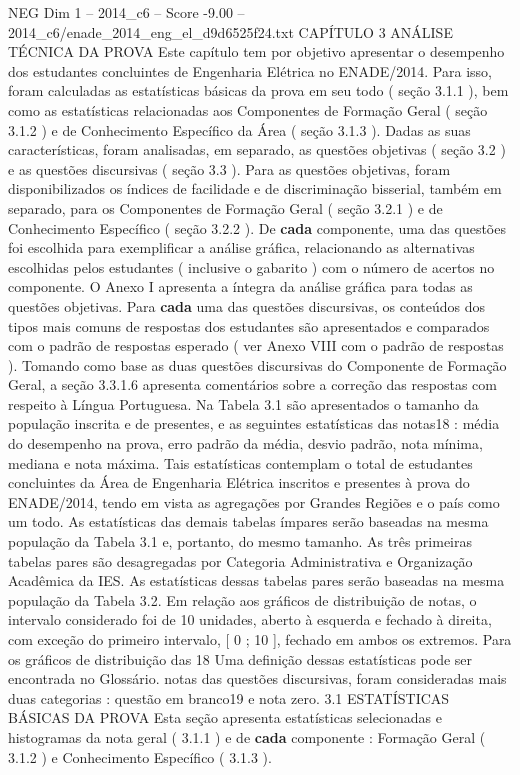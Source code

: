 \begin{textsample}{NEG Dim 1 – 2014\_c6 – Score -9.00 – 2014\_c6/enade\_2014\_eng\_el\_d9d6525f24.txt}  \label{ex:f1_neg_014}
CAPÍTULO 3 ANÁLISE TÉCNICA DA PROVA Este capítulo tem por objetivo apresentar o desempenho dos estudantes concluintes de Engenharia Elétrica no ENADE/2014.
Para isso, foram calculadas as estatísticas básicas da prova em seu todo ( seção 3.1.1 ), bem como as estatísticas relacionadas aos Componentes de Formação Geral ( seção 3.1.2 ) e de Conhecimento Específico da Área ( seção 3.1.3 ).
Dadas as suas características, foram analisadas, em separado, as questões objetivas ( seção 3.2 ) e as questões discursivas ( seção 3.3 ).
Para as questões objetivas, foram disponibilizados os índices de facilidade e de discriminação bisserial, também em separado, para os Componentes de Formação Geral ( seção 3.2.1 ) e de Conhecimento Específico ( seção 3.2.2 ).
De \textbf{cada} componente, uma das questões foi escolhida para exemplificar a análise gráfica, relacionando as alternativas escolhidas pelos estudantes ( inclusive o gabarito ) com o número de acertos no componente.
O Anexo I apresenta a íntegra da análise gráfica para todas as questões objetivas.
Para \textbf{cada} uma das questões discursivas, os conteúdos dos tipos mais comuns de respostas dos estudantes são apresentados e comparados com o padrão de respostas esperado ( ver Anexo VIII com o padrão de respostas ).
Tomando como base as duas questões discursivas do Componente de Formação Geral, a seção 3.3.1.6 apresenta comentários sobre a correção das respostas com respeito à Língua Portuguesa.
Na Tabela 3.1 são apresentados o tamanho da população inscrita e de presentes, e as seguintes estatísticas das notas18 : média do desempenho na prova, erro padrão da média, desvio padrão, nota mínima, mediana e nota máxima.
Tais estatísticas contemplam o total de estudantes concluintes da Área de Engenharia Elétrica inscritos e presentes à prova do ENADE/2014, tendo em vista as agregações por Grandes Regiões e o país como um todo.
As estatísticas das demais tabelas ímpares serão baseadas na mesma população da Tabela 3.1 e, portanto, do mesmo tamanho.
As três primeiras tabelas pares são desagregadas por Categoria Administrativa e Organização Acadêmica da IES.
As estatísticas dessas tabelas pares serão baseadas na mesma população da Tabela 3.2.
Em relação aos gráficos de distribuição de notas, o intervalo considerado foi de 10 unidades, aberto à esquerda e fechado à direita, com exceção do primeiro intervalo, [ 0 ; 10 ], fechado em ambos os extremos.
Para os gráficos de distribuição das 18 Uma definição dessas estatísticas pode ser encontrada no Glossário. notas das questões discursivas, foram consideradas mais duas categorias : questão em branco19 e nota zero. 3.1 ESTATÍSTICAS BÁSICAS DA PROVA Esta seção apresenta estatísticas selecionadas e histogramas da nota geral ( 3.1.1 ) e de \textbf{cada} componente : Formação Geral ( 3.1.2 ) e Conhecimento Específico ( 3.1.3 ).

\end{textsample}
